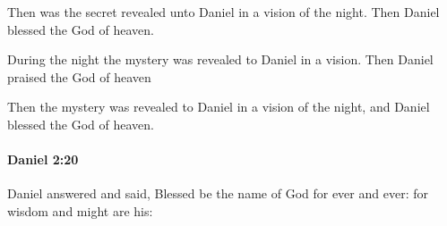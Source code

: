 			\begin{versebox}
					\item[BHS] 
					\item[LXX] 
					\item[ASV] Then was the secret revealed unto Daniel in a vision of the night. Then Daniel blessed the God of heaven.
					\item[NIV] During the night the mystery was revealed to Daniel in a vision. Then Daniel praised the God of heaven
					\item[NRSV] Then the mystery was revealed to Daniel in a vision of the night, and Daniel blessed the God of heaven.
			\end{versebox}

		\paragraph{Daniel 2:20} %
			\label{DANIEL-2-20}

			Daniel answered and said, Blessed be the name of God for ever and ever: for wisdom and might are his:

